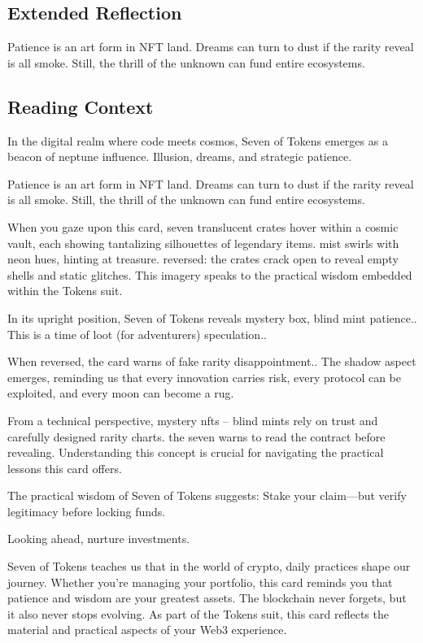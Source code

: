 \documentclass[11pt,oneside]{book}
\begin{document}
\begin{minipage}[t]{0.55\textwidth}
  \subsection*{Extended Reflection}
  Patience is an art form in NFT land. Dreams can turn to dust if the rarity reveal is all smoke. Still, the thrill of the unknown can fund entire ecosystems.

  \subsection*{Reading Context}
  In the digital realm where code meets cosmos, Seven of Tokens emerges as a beacon of neptune influence. Illusion, dreams, and strategic patience.

  Patience is an art form in NFT land. Dreams can turn to dust if the rarity reveal is all smoke. Still, the thrill of the unknown can fund entire ecosystems.

  When you gaze upon this card, seven translucent crates hover within a cosmic vault, each showing tantalizing silhouettes of legendary items. mist swirls with neon hues, hinting at treasure. reversed: the crates crack open to reveal empty shells and static glitches. This imagery speaks to the practical wisdom embedded within the Tokens suit.

  In its upright position, Seven of Tokens reveals mystery box, blind mint patience.. This is a time of loot (for adventurers) speculation..

  When reversed, the card warns of fake rarity disappointment.. The shadow aspect emerges, reminding us that every innovation carries risk, every protocol can be exploited, and every moon can become a rug.

  From a technical perspective, mystery nfts – blind mints rely on trust and carefully designed rarity charts. the seven warns to read the contract before revealing. Understanding this concept is crucial for navigating the practical lessons this card offers.

  The practical wisdom of Seven of Tokens suggests: Stake your claim—but verify legitimacy before locking funds.

  Looking ahead, nurture investments.

  Seven of Tokens teaches us that in the world of crypto, daily practices shape our journey. Whether you're managing your portfolio, this card reminds you that patience and wisdom are your greatest assets. The blockchain never forgets, but it also never stops evolving. As part of the Tokens suit, this card reflects the material and practical aspects of your Web3 experience.

\end{minipage}
\end{document}
